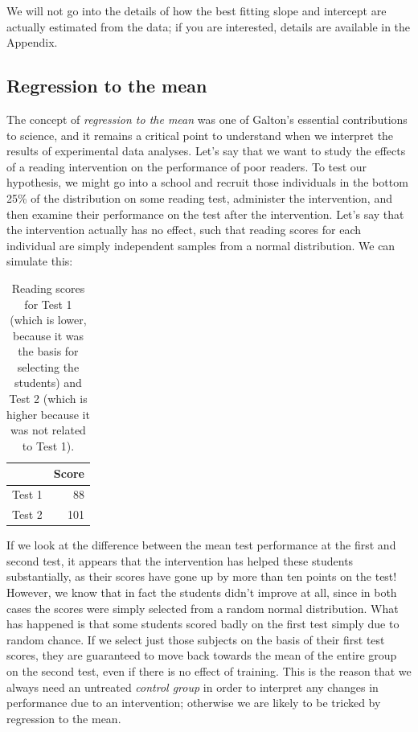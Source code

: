 \documentclass[12pt,]{book}
\theoremstyle{definition}
\theoremstyle{definition}
\theoremstyle{definition}
\theoremstyle{remark}
\begin{document}
We will not go into the details of how the best fitting slope and intercept are actually estimated from the data; if you are interested, details are available in the Appendix.

\hypertarget{regression-to-the-mean}{%
\subsection{Regression to the mean}\label{regression-to-the-mean}}

The concept of \emph{regression to the mean} was one of Galton's essential contributions to science, and it remains a critical point to understand when we interpret the results of experimental data analyses. Let's say that we want to study the effects of a reading intervention on the performance of poor readers. To test our hypothesis, we might go into a school and recruit those individuals in the bottom 25\% of the distribution on some reading test, administer the intervention, and then examine their performance on the test after the intervention. Let's say that the intervention actually has no effect, such that reading scores for each individual are simply independent samples from a normal distribution. We can simulate this:

\begin{table}

\caption{\label{tab:unnamed-chunk-101}Reading scores for Test 1 (which is lower, because it was the basis for selecting the students) and Test 2 (which is higher because it was not related to Test 1).}
\centering
\begin{tabular}[t]{l|r}
\hline
  & Score\\
\hline
Test 1 & 88\\
\hline
Test 2 & 101\\
\hline
\end{tabular}
\end{table}

If we look at the difference between the mean test performance at the first and second test, it appears that the intervention has helped these students substantially, as their scores have gone up by more than ten points on the test! However, we know that in fact the students didn't improve at all, since in both cases the scores were simply selected from a random normal distribution. What has happened is that some students scored badly on the first test simply due to random chance. If we select just those subjects on the basis of their first test scores, they are guaranteed to move back towards the mean of the entire group on the second test, even if there is no effect of training. This is the reason that we always need an untreated \emph{control group} in order to interpret any changes in performance due to an intervention; otherwise we are likely to be tricked by regression to the mean.
\end{document}
